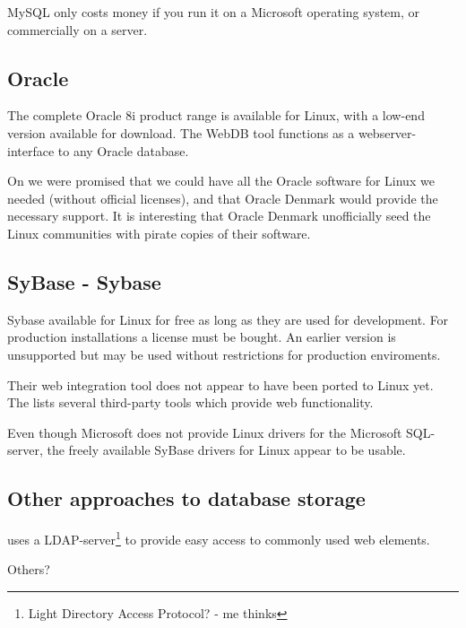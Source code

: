 MySQL only costs money if you run it on a Microsoft operating system,
or commercially on a server.

\subsection{Oracle}
\label{sec:oracle}

The complete Oracle 8i product range is available for Linux, with a
low-end version available for download.  The WebDB tool functions as a
webserver-interface to any Oracle database.

On  we were promised that we
could have all the Oracle software for Linux we needed (without
official licenses), and that Oracle Denmark would provide the
necessary support.  It is interesting that Oracle Denmark unofficially
seed the Linux communities with pirate copies of their software.

\subsection{SyBase - Sybase}

Sybase  available for
  Linux for free as long as they are used for development.  For
  production installations a license must be bought.  An earlier
  version is unsupported but may be used without restrictions for
  production enviroments.
  
  Their web integration tool does not appear to have been ported to
  Linux yet.  The  lists several third-party tools which provide web
  functionality.

  Even though Microsoft does not provide Linux drivers for the
  Microsoft SQL-server, the freely available SyBase drivers for Linux
  appear to be usable.

\subsection{Other approaches to database storage}

 uses a
LDAP-server\footnote{\textsf{Light Directory Access Protocol?} - me
  thinks} to provide easy access to commonly used web elements.

\textsf{Others?}


